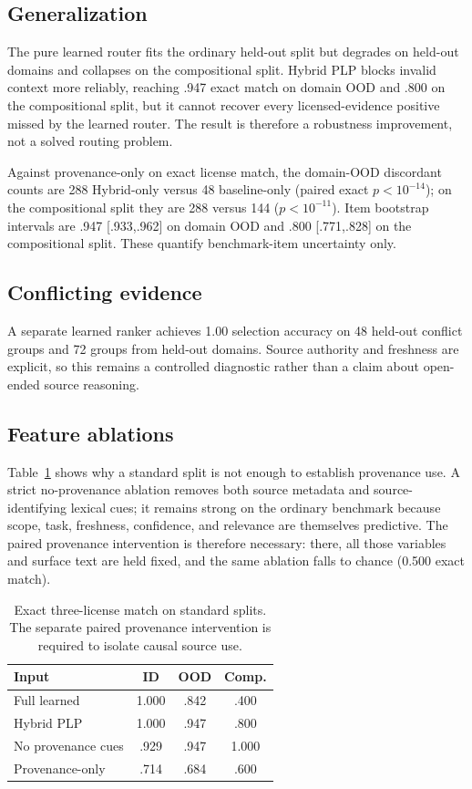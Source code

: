 \documentclass[10pt,twocolumn]{article}
\begin{document}
\subsection{Generalization}
The pure learned router fits the ordinary held-out split but degrades on held-out domains and collapses on the compositional split. Hybrid PLP blocks invalid context more reliably, reaching .947 exact match on domain OOD and .800 on the compositional split, but it cannot recover every licensed-evidence positive missed by the learned router. The result is therefore a robustness improvement, not a solved routing problem.

Against provenance-only on exact license match, the domain-OOD discordant counts are 288 Hybrid-only versus 48 baseline-only (paired exact $p<10^{-14}$); on the compositional split they are 288 versus 144 ($p<10^{-11}$). Item bootstrap intervals are .947 [.933,.962] on domain OOD and .800 [.771,.828] on the compositional split. These quantify benchmark-item uncertainty only.

\subsection{Conflicting evidence}
A separate learned ranker achieves 1.00 selection accuracy on 48 held-out conflict groups and 72 groups from held-out domains. Source authority and freshness are explicit, so this remains a controlled diagnostic rather than a claim about open-ended source reasoning.


\subsection{Feature ablations}
Table~\ref{tab:ablation} shows why a standard split is not enough to establish provenance use. A strict no-provenance ablation removes both source metadata and source-identifying lexical cues; it remains strong on the ordinary benchmark because scope, task, freshness, confidence, and relevance are themselves predictive. The paired provenance intervention is therefore necessary: there, all those variables and surface text are held fixed, and the same ablation falls to chance (0.500 exact match).

\begin{table}[h]\centering\small
\begin{tabular}{lccc}\toprule
Input & ID & OOD & Comp.\\\midrule
Full learned & 1.000 & .842 & .400\\
Hybrid PLP & 1.000 & .947 & .800\\
No provenance cues & .929 & .947 & 1.000\\
Provenance-only & .714 & .684 & .600\\\bottomrule
\end{tabular}
\caption{Exact three-license match on standard splits. The separate paired provenance intervention is required to isolate causal source use.}\label{tab:ablation}
\end{table}
\end{document}
